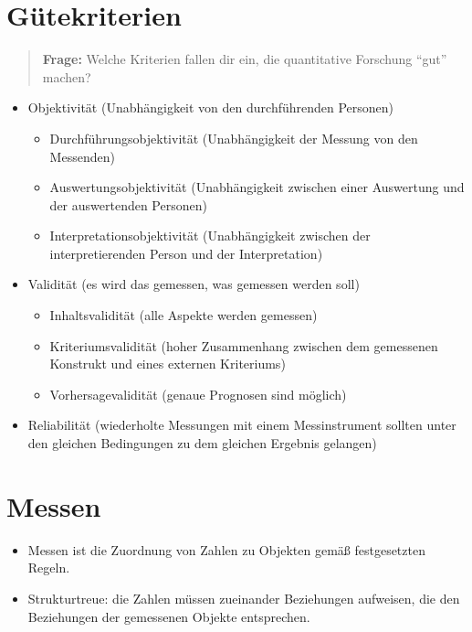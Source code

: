 \documentclass[
]{book}
\providecommand{\tightlist}{%
  \setlength{\itemsep}{0pt}\setlength{\parskip}{0pt}}
\begin{document}
\hypertarget{guxfctekriterien}{%
\section{Gütekriterien}\label{guxfctekriterien}}

\begin{quote}
\textbf{Frage:} Welche Kriterien fallen dir ein, die quantitative Forschung ``gut'' machen?
\end{quote}

\begin{itemize}
\tightlist
\item
  Objektivität (Unabhängigkeit von den durchführenden Personen)

  \begin{itemize}
  \tightlist
  \item
    Durchführungsobjektivität (Unabhängigkeit der Messung von den Messenden)
  \item
    Auswertungsobjektivität (Unabhängigkeit zwischen einer Auswertung und der auswertenden Personen)
  \item
    Interpretationsobjektivität (Unabhängigkeit zwischen der interpretierenden Person und der Interpretation)
  \end{itemize}
\item
  Validität (es wird das gemessen, was gemessen werden soll)

  \begin{itemize}
  \tightlist
  \item
    Inhaltsvalidität (alle Aspekte werden gemessen)
  \item
    Kriteriumsvalidität (hoher Zusammenhang zwischen dem gemessenen Konstrukt und eines externen Kriteriums)
  \item
    Vorhersagevalidität (genaue Prognosen sind möglich)
  \end{itemize}
\item
  Reliabilität (wiederholte Messungen mit einem Messinstrument sollten unter den gleichen Bedingungen zu dem gleichen Ergebnis gelangen)
\end{itemize}

\hypertarget{messen}{%
\section{Messen}\label{messen}}

\begin{itemize}
\tightlist
\item
  Messen ist die Zuordnung von Zahlen zu Objekten gemäß festgesetzten Regeln.
\item
  Strukturtreue: die Zahlen müssen zueinander Beziehungen aufweisen, die den Beziehungen der gemessenen Objekte entsprechen.
\end{itemize}
\end{document}
